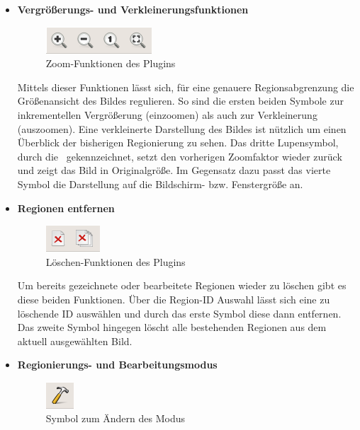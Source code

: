 \begin{itemize}
\item \textbf{Vergr\"o\ss erungs- und Verkleinerungsfunktionen}

\begin{figure}[h]
\centering
\includegraphics{gfx/Handbuch/zoom.png}
\caption[Zoom-Funktionen des Plugins]{Zoom-Funktionen des Plugins}
\label{gr:zoom}
\end{figure}
\FloatBarrier

Mittels dieser Funktionen l\"asst sich, f\"ur eine genauere Regionsabgrenzung die Gr\"o\ss enansicht des Bildes regulieren. So sind die ersten beiden Symbole zur inkrementellen Vergr\"o\ss erung (einzoomen) als auch zur Verkleinerung (auszoomen). Eine verkleinerte Darstellung des Bildes ist n\"utzlich um einen \"Uberblick der bisherigen Regionierung zu sehen. Das dritte Lupensymbol, durch die \grqq \ gekennzeichnet, setzt den vorherigen Zoomfaktor wieder zur\"uck und zeigt das Bild in Originalgr\"o\ss e. Im Gegensatz dazu passt das vierte Symbol die Darstellung auf die Bildschirm- bzw. Fenstergr\"o\ss e an.
\newline
\item \textbf{Regionen entfernen}

\begin{figure}[h]
\centering
\includegraphics{gfx/Handbuch/delete.png}
\caption[L\"oschen-Funktionen des Plugins]{L\"oschen-Funktionen des Plugins}
\label{gr:loeschen}
\end{figure}
\FloatBarrier

Um bereits gezeichnete oder bearbeitete Regionen wieder zu l\"oschen gibt es diese beiden Funktionen. \"Uber die Region-ID Auswahl l\"asst sich eine zu l\"oschende ID ausw\"ahlen und durch das erste Symbol diese dann entfernen. Das zweite Symbol hingegen l\"oscht alle bestehenden Regionen aus dem aktuell ausgew\"ahlten Bild.
\newline
\newpage
\item \textbf{Regionierungs- und Bearbeitungsmodus}

\begin{figure}[h]
\centering
\includegraphics{gfx/Handbuch/edit.png}
\caption[Symbol zum \"Andern des Modus]{Symbol zum \"Andern des Modus}
\label{gr:modus}
\end{figure}
\FloatBarrier


\end{itemize}
